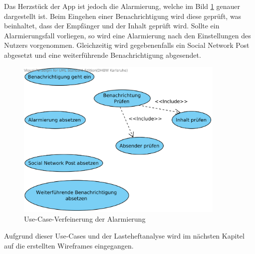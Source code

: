 Das Herzst\"uck der App ist jedoch die Alarmierung, welche im Bild \ref{Alarmierung Use Case} genauer dargestellt ist. Beim Eingehen einer Benachrichtigung wird diese gepr\"uft, was beinhaltet, dass der Empf\"anger und der Inhalt gepr\"uft wird. Sollte ein Alarmierungsfall vorliegen, so wird eine Alarmierung nach den Einstellungen des Nutzers vorgenommen. Gleichzeitig wird gegebenenfalls ein Social Network Post abgesetzt und eine weiterf\"uhrende Benachrichtigung abgesendet.
\begin{figure}[!ht]
\centering
\includegraphics[width=10cm]{Bilder/UseCaseAlarmierung.png}
\caption{Use-Case-Verfeinerung der Alarmierung}
\label{Alarmierung Use Case}
\centering
\end{figure}

Aufgrund dieser Use-Cases und der Lasteheftanalyse wird im n\"achsten Kapitel auf die erstellten Wireframes eingegangen.